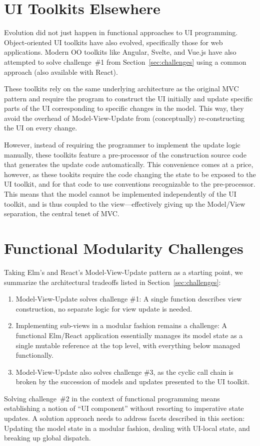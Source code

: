 \documentclass[sigplan,review,screen]{acmart}
\begin{document}
\section{UI Toolkits Elsewhere}
\label{sec:ui-toolkits-elsewhere}

Evolution did not just happen in functional approaches to UI
programming.  Object-oriented UI toolkits have also evolved,
specifically those for web applications.  Modern OO toolkits like
Angular, Svelte, and Vue.js have also attempted to solve challenge~\#1
from Section~\ref{sec:challenges} using a common approach (also
available with React).

These toolkits rely on the same underlying architecture as the
original MVC pattern and require the program to construct the UI
initially and update specific parts of the UI corresponding to
specific changes in the model.  This way, they avoid the overhead of
Model-View-Update from (conceptually) re-constructing the UI on every
change.

However, instead of requiring the programmer to implement the update
logic manually, these toolkits feature a pre-processor of the
construction source code that generates the update code automatically.
This convenience comes at a price, however, as these tookits require
the code changing the state to be exposed to the UI toolkit, and for
that code to use conventions recognizable to the pre-processor.  This
means that the model cannot be implemented independently of the UI
toolkit, and is thus coupled to the view---effectively giving up the
Model/View separation, the central tenet of MVC.

\section{Functional Modularity Challenges}
\label{sec:modularity-challenges}

Taking Elm's and React's Model-View-Update pattern as a starting
point, we summarize the architectural tradeoffs listed in
Section~\ref{sec:challenges}:
%
\begin{enumerate}
\item Model-View-Update solves challenge \#1: A single function
  describes view construction, no separate logic for view update is
  needed.
\item Implementing sub-views in a modular fashion remains a challenge:
  A functional Elm/React application essentially manages its model
  state as a single mutable reference at the top level, with
  everything below managed functionally.
\item Model-View-Update also solves challenge \#3, as the cyclic call
  chain is broken by the succession of models and updates
  presented to the UI toolkit.
\end{enumerate}
%
Solving challenge~\#2 in the context of functional programming
means establishing a notion of ``UI
component'' without resorting to imperative state updates.  A solution
approach needs to address facets described in this section: Updating
the model state in a modular fashion, dealing with UI-local state, and
breaking up global dispatch.
\end{document}
